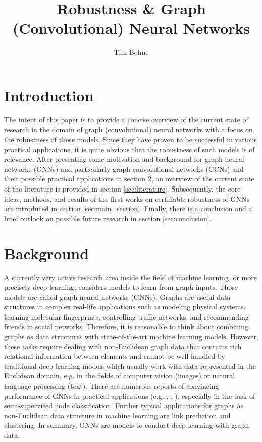 \documentclass[a4paper,preprint]{sig-alternate}
\begin{document}
\title{Robustness \& Graph (Convolutional) Neural Networks}

%
\author{
%
\alignauthor Tim Bohne\\
}

\maketitle

\section{Introduction}

The intent of this paper is to provide a concise overview of the current state of research in the domain of graph (convolutional) neural networks
with a focus on the robustness of these models. Since they have proven to be successful in various practical applications, 
it is quite obvious that the robustness of such models is of relevance.
After presenting some motivation and background for graph neural networks (GNNs) and particularly graph convolutional networks (GCNs)
and their possible practical applications in section \ref{sec:background}, an overview of the current state of the literature is
provided in section \ref{sec:literature}. Subsequently, the core ideas, methods, and results of the first works on certifiable
robustness of GNNs are introduced in section \ref{sec:main_section}.
Finally, there is a conclusion and a brief outlook on possible future research in section \ref{sec:conclusion}.

\section{Background}
\label{sec:background}

A currently very active research area inside the field of machine learning, or more precisely deep learning, considers models to learn
from graph inputs. Those models are called graph neural networks (GNNs). Graphs are useful data structures in complex real-life
applications such as modeling physical systems, learning molecular fingerprints, controlling traffic networks, and recommending 
friends in social networks.\cite{Liu_2020}
Therefore, it is reasonable to think about combining graphs as data structures with state-of-the-art machine learning models.
However, these tasks require dealing with non-Euclidean graph data that contains rich relational information between elements and
cannot be well handled by traditional deep learning models which usually work with data represented in the Euclidean domain, e.g. in the
fields of computer vision (images) or natural language processing (text).\cite{Liu_2020}
There are numerous reports of convincing performance of GNNs in practical applications (e.g. \cite{NIPS2015_f9be311e},
\cite{hamilton2018inductive}, \cite{trivedi2017knowevolve}), especially in the task of semi-supervised node classification.\cite{xu2019topology}
Further typical applications for graphs as non-Euclidean data structure in machine learning are link prediction and clustering.\cite{Zhou_2019}
In summary, GNNs are models to conduct deep learning with graph data.
\end{document}
